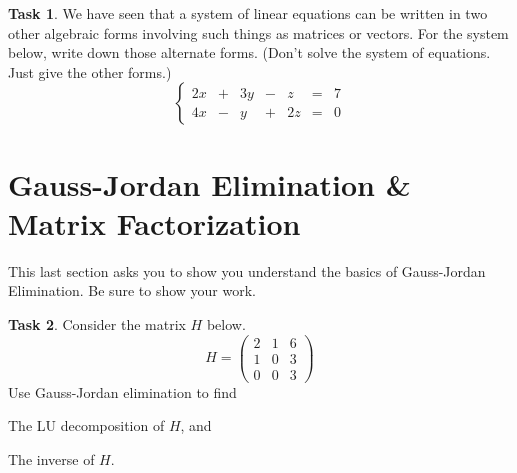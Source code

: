 \documentclass[11pt]{amsart}
\theoremstyle{definition}
\newtheorem{task}{Task}
\begin{document}
\begin{task} We have seen that a system of linear equations can be written in two other algebraic forms involving such things as matrices or vectors. For the system below, write down those alternate forms. (Don't solve the system of equations. Just give the other forms.)
\begin{equation*}
\left\{\begin{array}{rrrrrrr}
2x & + & 3y & - & z & = & 7\\
4x & - & y & + & 2z & = & 0
\end{array}\right.
\end{equation*}
\end{task}



\section{Gauss-Jordan Elimination \& Matrix Factorization}

This last section asks you to show you understand the basics of Gauss-Jordan Elimination. Be sure to show your work.

\begin{task}
Consider the matrix $H$ below.
\begin{equation*}
H = \begin{pmatrix} 2 & 1 & 6 \\ 1 & 0 & 3 \\ 0 & 0 & 3 \end{pmatrix}
\end{equation*}
Use Gauss-Jordan elimination to find
\begin{compactitem}
\item The LU decomposition of $H$, and
\item The inverse of $H$.
\end{compactitem}
\end{task}

\end{document}
